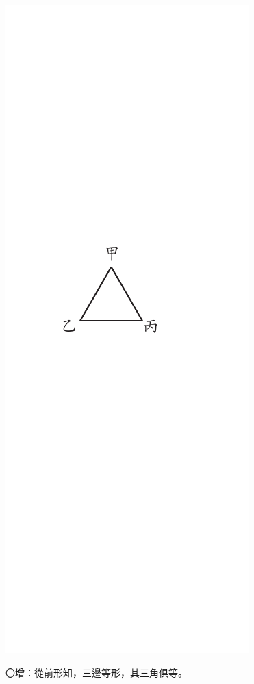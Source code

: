 \documentclass[12pt,b5paper,landscape]{article}
\newcommand{\bcom}[1]{〇#1}
\begin{document}
\begin{multicols}{2}
\begin{center}
\includegraphics[angle=90]{eu40}
\end{center}
\bcom{增：從前形知，三邊等形，其三角俱等。}


\end{multicols}
\end{document}
